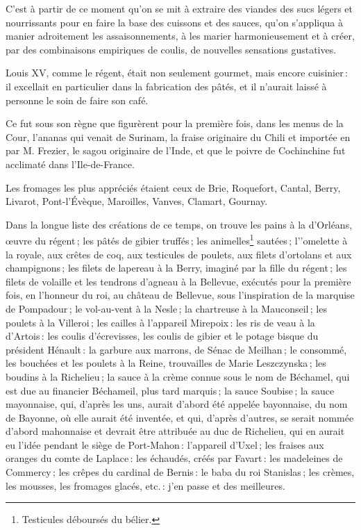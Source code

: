 C'est à partir de ce moment qu'on se mit à extraire des viandes des sucs légers
et nourrissants pour en faire la base des cuissons et des sauces, qu'on
s'appliqua à manier adroitement les assaisonnements, à les marier
harmonieusement et à créer, par des combinaisons empiriques de coulis, de
nouvelles sensations gustatives.

Louis XV, comme le régent, était non seulement gourmet, mais encore cuisinier :
il excellait en particulier dans la fabrication des pâtés, et il n'aurait
laissé à personne le soin de faire son café.

Ce fut sous son règne que figurèrent pour la première fois, dans les menus de
la Cour, l'ananas qui venait de Surinam, la fraise originaire du Chili et
importée en {\mmm} {\mmm} par M. Frezier, le sagou originaire de
l'Inde, et que le poivre de Cochinchine fut acclimaté dans l'Ile-de-France.

Les fromages les plus appréciés étaient ceux de Brie, Roquefort, Cantal, Berry,
Livarot, Pont-l'Évèque, Maroilles, Vanves, Clamart, Gournay.

Dans la longue liste des créations de ce temps, on trouve les pains à la
d'Orléans, œuvre du régent ; les pâtés de gibier truffés ; les
animelles\footnote{Testicules déboursés du bélier.} sautées ; l’'omelette à la
royale, aux crêtes de coq, aux testicules de poulets, aux filets d'ortolans et
aux champignons ; les filets de lapereau à la Berry, imaginé par la fille du
régent ; les filets de volaille et les tendrons d'agneau à la Bellevue,
exécutés pour la première fois, en l'honneur du roi, au château de Bellevue,
sous l'inspiration de la marquise de Pompadour ; le vol-au-vent à la Nesle ; la
chartreuse à la Mauconseil ; les poulets à la Villeroi ; les cailles
à l'appareil Mirepoix : les ris de veau à la d'Artois : les coulis d'écrevisses,
les coulis de gibier et le potage bisque du président Hénault : la garbure aux
marrons, de Sénac de Meilhan ; le consommé, les bouchées et les poulets à la
Reine, trouvailles de Marie Leszczynska ; les boudins à la Richelieu ; la sauce
à la crème connue sous le nom de Béchamel, qui est due au financier Béchameil,
plus tard marquis ; la sauce Soubise ; la sauce mayonnaise, qui, d'après les
uns, aurait d’abord été appelée bayonnaise, du nom de Bayonne, où elle aurait
été inventée, et qui, d'après d'autres, se serait nommée d'abord mahonnaise et
devrait être attribuée au duc de Richelieu, qui en aurait eu l'idée pendant le
siège de Port-Mahon : l'appareil d'Uxel ; les fraises aux oranges du comte de
Laplace : les échaudés, créés par Favart : les madeleines de Commercy ; les
crêpes du cardinal de Bernis : le baba du roi Stanislas ; les crèmes, les
mousses, les fromages glacés, etc. : j'en passe et des meilleures.

